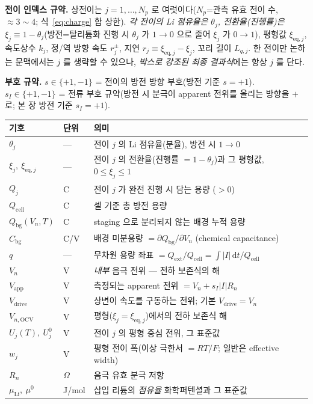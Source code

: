 \documentclass[11pt,a4paper]{article}
\newcommand{\dd}{\mathrm{d}}
\newcommand{\eq}{\mathrm{eq}}
\newcommand{\app}{\mathrm{app}}
\newcommand{\drive}{\mathrm{drive}}
\newcommand{\cell}{\mathrm{cell}}
\newcommand{\bg}{\mathrm{bg}}
\newcommand{\ext}{\mathrm{ext}}
\newcommand{\OCV}{\mathrm{OCV}}
\begin{document}
\textbf{전이 인덱스 규약.} 상전이는 $j=1,\dots,N_p$ 로 여럿이다($N_p$=관측 유효 전이 수, $\approx3\sim4$; 식~\eqref{eq:charge} 합 상한). \emph{각 전이의 Li 점유율은 $\theta_j$, 전환율(진행률)은 $\xi_j\equiv1-\theta_j$}(방전=탈리튬화 진행 시 $\theta_j$ 가 $1\to0$ 으로 줄어 $\xi_j$ 가 $0\to1$), 평형값
$\xi_{\eq,j}$, 속도상수 $k_j$, 정/역 방향 속도 $r_j^\pm$, 지연 $r_j\equiv\xi_{\eq,j}-\xi_j$, 꼬리 길이
$L_{q,j}$. 한 전이만 논하는 문맥에서는 $j$ 를 생략할 수 있으나, \emph{박스로 강조된 최종 결과식}에는 항상 $j$ 를
단다.

\textbf{부호 규약.} $s\in\{+1,-1\}$ = 전이의 방전 방향 부호(방전 기준 $s=+1$). $s_I\in\{+1,-1\}$ = 전류 부호
규약(방전 시 분극이 apparent 전위를 올리는 방향을 $+$ 로; 본 장 방전 기준 $s_I=+1$).

\begin{longtable}{p{} p{} p{}}
\toprule 기호 & 단위 & 의미 \\ \midrule \endhead
$\theta_j$ & --- & 전이 $j$ 의 Li 점유율(분율), 방전 시 $1\to0$ \\
$\xi_j,\ \xi_{\eq,j}$ & --- & 전이 $j$ 의 전환율(진행률 $=1-\theta_j$)과 그 평형값, $0\le\xi_j\le1$ \\
$Q_j$ & C & 전이 $j$ 가 완전 진행 시 담는 용량 ($>0$) \\
$Q_\cell$ & C & 셀 기준 총 방전 용량 \\
$Q_\bg(V_n,T)$ & C & staging 으로 분리되지 않는 배경 누적 용량 \\
$C_\bg$ & C/V & 배경 미분용량 $=\partial Q_\bg/\partial V_n$ (chemical capacitance) \\
$q$ & --- & 무차원 용량 좌표 $=Q_\ext/Q_\cell=\int|I|\,\dd t/Q_\cell$ \\
$V_n$ & V & \emph{내부} 음극 전위 — 전하 보존식의 해 \\
$V_\app$ & V & 측정되는 apparent 전위 $=V_n+s_I|I|R_n$ \\
$V_\drive$ & V & 상변이 속도를 구동하는 전위; 기본 $V_\drive=V_n$ \\
$V_{n,\OCV}$ & V & 평형($\xi_j=\xi_{\eq,j}$)에서의 전하 보존식 해 \\
$U_j(T),\ U_j^0$ & V & 전이 $j$ 의 평형 중심 전위, 그 표준값 \\
$w_j$ & V & 평형 전이 폭(이상 극한서 $=RT/F$; 일반은 effective width) \\
$R_n$ & $\Omega$ & 음극 유효 분극 저항 \\
$\mu_\mathrm{Li},\ \mu^0$ & J/mol & 삽입 리튬의 \emph{점유율} 화학퍼텐셜과 그 표준값 \\

\end{longtable}
\end{document}
